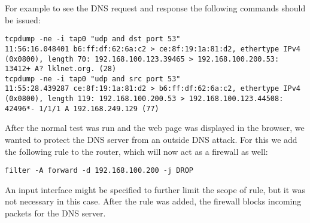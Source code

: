 For example to see the DNS request and response the following commands should be issued:
\lstset{language=zsh, caption=DNS request and respons, label=lst:dnsrr}
\begin{lstlisting}
tcpdump -ne -i tap0 "udp and dst port 53"
11:56:16.048401 b6:ff:df:62:6a:c2 > ce:8f:19:1a:81:d2, ethertype IPv4 (0x0800), length 70: 192.168.100.123.39465 > 192.168.100.200.53: 13412+ A? lklnet.org. (28)
tcpdump -ne -i tap0 "udp and src port 53"
11:55:28.439287 ce:8f:19:1a:81:d2 > b6:ff:df:62:6a:c2, ethertype IPv4 (0x0800), length 119: 192.168.100.200.53 > 192.168.100.123.44508: 42496*- 1/1/1 A 192.168.249.129 (77)
\end{lstlisting}


After the normal test was run and the web page was displayed in the browser, we wanted to protect the DNS server from 
an outside DNS attack. For this we add the following rule to the router, which will now act as a firewall as well:
\lstset{language=zsh, caption=, label=complex-firewall}
\begin{lstlisting}
filter -A forward -d 192.168.100.200 -j DROP
\end{lstlisting}
An input interface might be specified to further limit the scope of rule, but it was not necessary in this case.
After the rule was added, the firewall blocks incoming packets for the DNS server.
